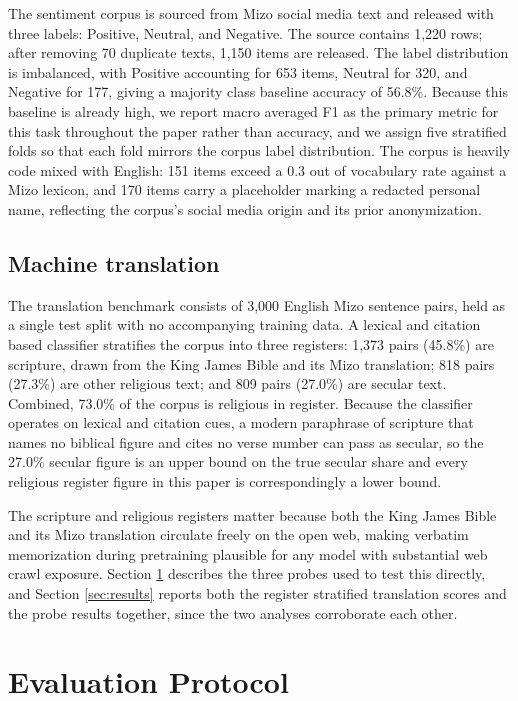 \documentclass[pdflatex,sn-mathphys-ay]{sn-jnl}
\begin{document}
The sentiment corpus is sourced from Mizo social media text and released with three labels: Positive, Neutral, and Negative. The source contains 1,220 rows; after removing 70 duplicate texts, 1,150 items are released. The label distribution is imbalanced, with Positive accounting for 653 items, Neutral for 320, and Negative for 177, giving a majority class baseline accuracy of 56.8\%. Because this baseline is already high, we report macro averaged F1 as the primary metric for this task throughout the paper rather than accuracy, and we assign five stratified folds so that each fold mirrors the corpus label distribution. The corpus is heavily code mixed with English: 151 items exceed a 0.3 out of vocabulary rate against a Mizo lexicon, and 170 items carry a placeholder marking a redacted personal name, reflecting the corpus's social media origin and its prior anonymization.

\subsection{Machine translation}
\label{sec:mt-data}

The translation benchmark consists of 3,000 English Mizo sentence pairs, held as a single test split with no accompanying training data. A lexical and citation based classifier stratifies the corpus into three registers: 1,373 pairs (45.8\%) are scripture, drawn from the King James Bible and its Mizo translation; 818 pairs (27.3\%) are other religious text; and 809 pairs (27.0\%) are secular text. Combined, 73.0\% of the corpus is religious in register. Because the classifier operates on lexical and citation cues, a modern paraphrase of scripture that names no biblical figure and cites no verse number can pass as secular, so the 27.0\% secular figure is an upper bound on the true secular share and every religious register figure in this paper is correspondingly a lower bound.

The scripture and religious registers matter because both the King James Bible and its Mizo translation circulate freely on the open web, making verbatim memorization during pretraining plausible for any model with substantial web crawl exposure. Section \ref{sec:protocol} describes the three probes used to test this directly, and Section \ref{sec:results} reports both the register stratified translation scores and the probe results together, since the two analyses corroborate each other.

\section{Evaluation Protocol}
\label{sec:protocol}
\end{document}
